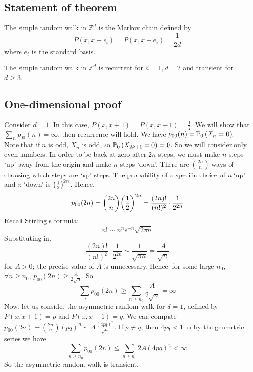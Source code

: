 \subsection{Statement of theorem}
\begin{definition}
	The simple random walk in \( \mathbb Z^d \) is the Markov chain defined by
	\[
		P(x,x+e_i) = P(x,x-e_i) = \frac{1}{2d}
	\]
	where \( e_i \) is the standard basis.
\end{definition}
\begin{theorem}
	The simple random walk in \( \mathbb Z^d \) is recurrent for \( d = 1, d = 2 \) and transient for \( d \geq 3 \).
\end{theorem}

\subsection{One-dimensional proof}
Consider \( d = 1 \).
In this case, \( P(x,x+1) = P(x,x-1) = \frac{1}{2} \).
We will show that \( \sum_n p_{00}(n) = \infty \), then recurrence will hold.
We have \( p_{00}(n) = \mathbb{P}_{0}\left({X_n = 0}\right) \).
Note that if \( n \) is odd, \( X_n \) is odd, so \( \mathbb{P}_{0}\left({X_{2k+1} = 0}\right) = 0 \).
So we will consider only even numbers.
In order to be back at zero after \( 2n \) steps, we must make \( n \) steps `up' away from the origin and make \( n \) steps `down'.
There are \( \binom{2n}{n} \) ways of choosing which steps are `up' steps.
The probability of a specific choice of \( n \) `up' and \( n \) `down' is \( \qty(\frac{1}{2})^{2n} \).
Hence,
\[
	p_{00}(2n) = \binom{2n}{n} \qty(\frac{1}{2})^{2n} = \frac{(2n)!}{(n!)^2} \cdot \frac{1}{2^{2n}}
\]
Recall Stirling's formula:
\[
	n!
	\sim n^n e^{-n} \sqrt{2 \pi n}
\]
Substituting in,
\[
	\frac{(2n)!}{(n!)^2} \cdot \frac{1}{2^{2n}} \sim \frac{1}{\sqrt{\pi n}} = \frac{A}{\sqrt{n}}
\]
for \( A > 0 \); the precise value of \( A \) is unnecessary.
Hence, for some large \( n_0 \), \( \forall n \geq n_0 \), \( p_{00}(2n) \geq \frac{A}{2\sqrt{n}} \).
So
\[
	\sum_n p_{00}(2n) \geq \sum_{n \geq n_0} \frac{A}{2\sqrt{n}} = \infty
\]
Now, let us consider the asymmetric random walk for \( d = 1 \), defined by \( P(x,x+1) = p \) and \( P(x,x-1) = q \).
We can compute \( p_{00}(2n) = \binom{2n}{n} (pq)^n \sim A \frac{(4pq)^n}{\sqrt{n}} \).
If \( p \neq q \), then \( 4pq < 1 \) so by the geometric series we have
\[
	\sum_{n \geq n_0} p_{00}(2n) \leq \sum_{n \geq n_0} 2A (4pq)^n < \infty
\]
So the asymmetric random walk is transient.

